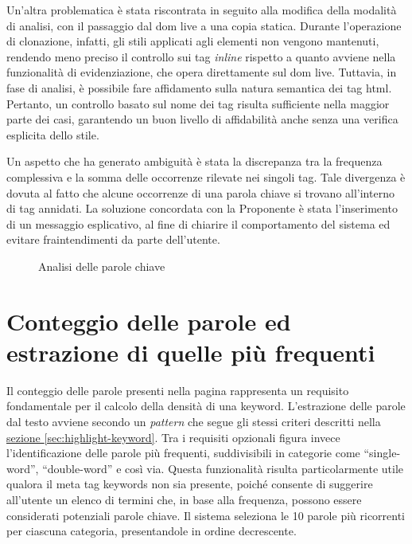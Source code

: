 \vspace{10pt}
\par\noindent Un’altra problematica è stata riscontrata in seguito alla modifica della modalità di analisi, con il passaggio dal \gls{dom} live a una copia statica. Durante l’operazione di clonazione, infatti, gli stili applicati agli elementi non vengono mantenuti, rendendo meno preciso il controllo sui tag \textit{inline} rispetto a quanto avviene nella funzionalità di evidenziazione, che opera direttamente sul \gls{dom} live. Tuttavia, in fase di analisi, è possibile fare affidamento sulla natura semantica dei tag \gls{html}. Pertanto, un controllo basato sul nome dei tag risulta sufficiente nella maggior parte dei casi, garantendo un buon livello di affidabilità anche senza una verifica esplicita dello stile.

\vspace{10pt}
\par\noindent Un aspetto che ha generato ambiguità è stata la discrepanza tra la frequenza complessiva e la somma delle occorrenze rilevate nei singoli tag. Tale divergenza è dovuta al fatto che alcune occorrenze di una parola chiave si trovano all’interno di tag annidati. La soluzione concordata con la Proponente è stata l’inserimento di un messaggio esplicativo, al fine di chiarire il comportamento del sistema ed evitare fraintendimenti da parte dell’utente.

\begin{figure}[H]
  \centering 
  \caption{Analisi delle parole chiave}
\end{figure}

\section{Conteggio delle parole ed estrazione di quelle più frequenti}
\label{sec:count-word}

\par Il conteggio delle parole presenti nella pagina rappresenta un requisito fondamentale per il calcolo della densità di una keyword. L'estrazione delle parole dal testo avviene secondo un \textit{pattern} che segue gli stessi criteri descritti nella \hyperref[sec:highlight-keyword]{sezione \textsection\ref*{sec:highlight-keyword}}. Tra i \gls{requisiti} opzionali figura invece l'identificazione delle parole più frequenti, suddivisibili in categorie come “single-word”, “double-word” e così via. Questa funzionalità risulta particolarmente utile qualora il meta tag keywords non sia presente, poiché consente di suggerire all’utente un elenco di termini che, in base alla frequenza, possono essere considerati potenziali parole chiave. Il sistema seleziona le 10 parole più ricorrenti per ciascuna categoria, presentandole in ordine decrescente.

